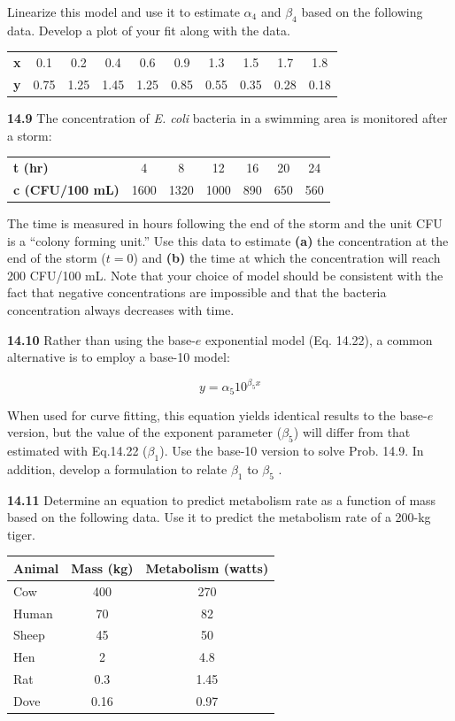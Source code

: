 \documentclass[../main.tex]{subfiles}
\begin{document}
\begin{multicols}{2}
	\noindent Linearize this model and use it to estimate $\alpha_4$ and $\beta_4$ based
	on the following data. Develop a plot of your fit along with
	the data.

	\noindent \begin{tabular}{c c c c c c c c c c}
		\textbf{x} & 0.1 & 0.2 & 0.4 & 0.6 & 0.9 & 1.3 & 1.5 & 1.7 & 1.8 \\
		\textbf{y} & 0.75 & 1.25 & 1.45 & 1.25 & 0.85 & 0.55 & 0.35 & 0.28 & 0.18	
  	\end{tabular}

	\noindent\textbf{14.9} The concentration of \textit{E. coli} bacteria in a swimming
	area is monitored after a storm:

	\noindent \begin{tabular}{l c c c c c c}
		\textbf{t (hr)} & 4 & 8 & 12 & 16 & 20 & 24 \\
		\textbf{c (CFU/100 mL)} & 1600 & 1320 & 1000 & 890 & 650 & 560
  	\end{tabular}

	\noindent The time is measured in hours following the end of the storm
	and the unit CFU is a ``colony forming unit.'' Use this data to
	estimate \textbf{(a)} the concentration at the end of the storm ($t = 0$)
	and \textbf{(b)} the time at which the concentration will reach
	200 CFU/100 mL. Note that your choice of model should
	be consistent with the fact that negative concentrations are
	impossible and that the bacteria concentration always decreases with time.

	\noindent\textbf{14.10} Rather than using the base-$e$ exponential model
	(Eq. 14.22), a common alternative is to employ a base-10
	model:

	$$y = \alpha_5 10^{\beta_5 x}$$

	\noindent When used for curve fitting, this equation yields identical
	results to the base-$e$ version, but the value of the exponent
	parameter ($\beta_5$) will differ from that estimated with Eq.14.22
	($\beta_1$). Use the base-10 version to solve Prob. 14.9. In addition, develop a formulation to relate $\beta_1$ to $\beta_5$ .

	\noindent\textbf{14.11} Determine an equation to predict metabolism rate as a
	function of mass based on the following data. Use it to predict the metabolism rate of a 200-kg tiger.

	\noindent \begin{tabular}{l c c }
		\textbf{Animal} & \textbf{Mass (kg)} & \textbf{Metabolism (watts)} \\
		\hline
		Cow &  400 &  270 \\
		Human &  70 &  82 \\ 
		Sheep &  45 &  50 \\ 
		Hen &  2 &  4.8 \\ 
		Rat &  0.3 &  1.45 \\ 
		Dove &  0.16 &  0.97
  	\end{tabular}


\end{multicols}
\end{document}
